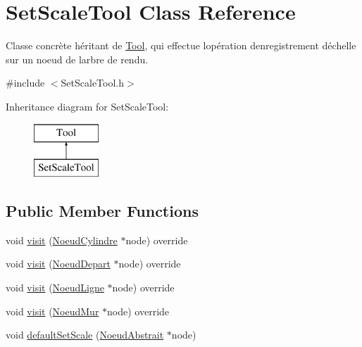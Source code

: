 \hypertarget{class_set_scale_tool}{}\section{Set\+Scale\+Tool Class Reference}
\label{class_set_scale_tool}


Classe concrète héritant de \hyperlink{class_tool}{Tool}, qui effectue l\textquotesingle{}opération d\textquotesingle{}enregistrement d\textquotesingle{}échelle sur un noeud de l\textquotesingle{}arbre de rendu.  




{\ttfamily \#include $<$Set\+Scale\+Tool.\+h$>$}

Inheritance diagram for Set\+Scale\+Tool\+:\begin{figure}[H]
\begin{center}
\leavevmode
\includegraphics[height=2.000000cm]{class_set_scale_tool}
\end{center}
\end{figure}
\subsection*{Public Member Functions}
\begin{DoxyCompactItemize}
\item 
void \hyperlink{group__inf2990_gae12ec27e420078166d0f1fbce51ea3c1}{visit} (\hyperlink{class_noeud_cylindre}{Noeud\+Cylindre} $\ast$node) override
\item 
void \hyperlink{group__inf2990_ga372ff3eab42997c84eb768fdf72a5dcc}{visit} (\hyperlink{class_noeud_depart}{Noeud\+Depart} $\ast$node) override
\item 
void \hyperlink{group__inf2990_ga5ee39e2a3ccf356b094e692d43beecb8}{visit} (\hyperlink{class_noeud_ligne}{Noeud\+Ligne} $\ast$node) override
\item 
void \hyperlink{group__inf2990_ga51cfb7f08b02858b45b2beb9e51a8dce}{visit} (\hyperlink{class_noeud_mur}{Noeud\+Mur} $\ast$node) override
\item 
void \hyperlink{group__inf2990_ga589b51975cc03cea1752747ef558a45d}{default\+Set\+Scale} (\hyperlink{class_noeud_abstrait}{Noeud\+Abstrait} $\ast$node)
\end{DoxyCompactItemize}


